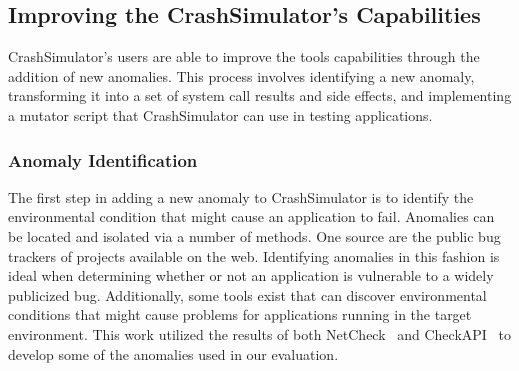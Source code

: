 
\subsection{Improving the CrashSimulator's Capabilities}

CrashSimulator's users are able to improve the tools capabilities through
the addition of new anomalies.  This process involves identifying a new
anomaly, transforming it into a set of system call results and side
effects, and implementing a mutator script that CrashSimulator can use in
testing applications.

\subsubsection{Anomaly Identification} \label{subsec:anomalyidentification}

The first step in adding a new anomaly to CrashSimulator is to identify the
environmental condition that might cause an application to fail.
Anomalies can be located and isolated via a number of methods. One source
are the public bug trackers of projects available on the web.
Identifying anomalies in this fashion is ideal when determining
whether or not an application is vulnerable to a widely publicized bug.
Additionally, some tools exist that can discover environmental conditions
that might cause problems
for applications
running in the target environment.  This
work utilized the results of both NetCheck~\cite{Zhuang_NSDI_2014} and
CheckAPI~\cite{rasley2015detecting}
to develop some of the
anomalies used in our evaluation.


